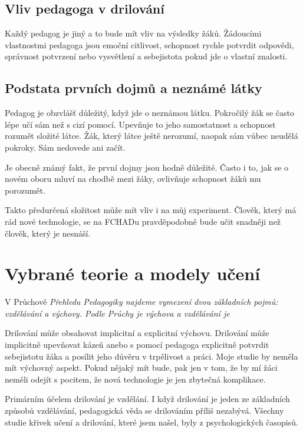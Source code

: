 \subsection{Vliv pedagoga v drilování}

Každý pedagog je jiný a to bude mít vliv na výsledky žáků.  Žádoucími vlastnostmi pedagoga jsou emoční citlivost, schopnost rychle potvrdit odpovědi, správnost potvrzení nebo vysvětlení a sebejistota pokud jde o vlastní znalosti.

\subsection{Podstata prvních dojmů a neznámé látky}

Pedagog je obzvlášť důležitý, když jde o neznámou látku.  Pokročilý žák se často lépe učí sám než s cizí pomocí.  Upevňuje to jeho samostatnost a schopnost rozumět složité látce.  Žák, který látce ještě nerozumí, naopak sám vůbec neudělá pokroky.  Sám nedovede ani začít.

Je obecně známý fakt, že první dojmy jsou hodně důležité.  Často i to, jak se o novém oboru mluví na chodbě mezi žáky, ovlivňuje schopnost žáků mu porozumět.

Takto předurčená složitost může mít vliv i na můj experiment. Člověk, který má rád nové technologie, se na FCHADu pravděpodobně bude učit snadněji než člověk, který je nesnáší.

\section{Vybrané teorie a modely učení}

V Průchově \em Přehledu Pedagogiky \em najdeme vymezení dvou základních pojmů: vzdělávání a výchovy.  Podle Průchy je výchova  a vzdělávání je \citep[str. 16-17]{prucha2009prehled}

Drilování může obsahovat implicitní a explicitní výchovu.  Drilování může implicitně upevňovat kázeň anebo s pomocí pedagoga explicitně potvrdit sebejistotu žáka a posílit jeho důvěru v trpělivost a práci.  Moje studie by neměla mít výchovný aspekt. Pokud nějaký mít bude, pak jen v tom, že by mí žáci neměli odejít s pocitem, že nová technologie je jen zbytečná komplikace.

Primárním účelem drilování je vzdělání.  I když drilování je jeden ze základních způsobů vzdělávání, pedagogická věda se drilováním příliš nezabývá. Všechny studie křivek učení a drilování, které jsem našel, byly z psychologických časopisů.

